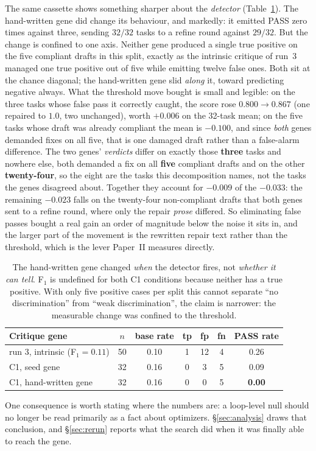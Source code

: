 \documentclass[11pt]{article}
\begin{document}
The same cassette shows something sharper about the \emph{detector} (Table~\ref{tab:c1}). The
hand-written gene did change its behaviour, and markedly: it emitted PASS zero times
against three, sending $32/32$ tasks to a refine round against $29/32$. But the change is
confined to one axis. Neither gene produced a single true positive on the five compliant
drafts in this split, exactly as the intrinsic critique of run~3 managed one true positive
out of five while emitting twelve false ones. Both sit at the chance diagonal; the
hand-written gene slid \emph{along} it, toward predicting negative always. What the
threshold move bought is small and legible: on the three tasks whose false pass it
correctly caught, the score rose $0.800 \to 0.867$ (one repaired to $1.0$, two unchanged),
worth $+0.006$ on the 32-task mean; on the five tasks whose draft was already compliant the
mean is $-0.100$, and since \emph{both} genes demanded fixes on all five, that is one damaged
draft rather than a false-alarm difference. The two genes' \emph{verdicts} differ on exactly
those \textbf{three} tasks and nowhere else, both demanded a fix on all \textbf{five}
compliant drafts and on the other \textbf{twenty-four}, so the eight are the tasks this
decomposition names, not the tasks the genes disagreed about. Together they account for
$-0.009$ of the $-0.033$: the remaining $-0.023$ falls on the twenty-four non-compliant drafts
that both genes sent to a refine round, where only the repair \emph{prose} differed. So eliminating false passes bought a real gain an order of
magnitude below the noise it sits in, and the larger part of the movement is the rewritten repair
text rather than the threshold, which is the lever Paper~II measures
directly.

\begin{table}[h]
\centering
\small
\begin{tabular}{lcccccc}
\toprule
Critique gene & $n$ & base rate & tp & fp & fn & PASS rate \\
\midrule
run 3, intrinsic (F$_1 = 0.11$) & 50 & 0.10 & 1 & 12 & 4 & 0.26 \\
C1, seed gene & 32 & 0.16 & 0 & 3 & 5 & 0.09 \\
C1, hand-written gene & 32 & 0.16 & 0 & 0 & 5 & \textbf{0.00} \\
\bottomrule
\end{tabular}
\caption{The hand-written gene changed \emph{when} the detector fires, not \emph{whether it
can tell}. F$_1$ is undefined for both C1 conditions because neither has a true positive.
With only five positive cases per split this cannot separate ``no discrimination'' from
``weak discrimination'', the claim is narrower: the measurable change was confined to the
threshold.}
\label{tab:c1}
\end{table}

One consequence is worth stating where the numbers are: a loop-level null should no longer be read
primarily as a fact about optimizers. \S\ref{sec:analysis} draws that conclusion, and
\S\ref{sec:rerun} reports what the search did when it was finally able to reach the gene.
\end{document}
